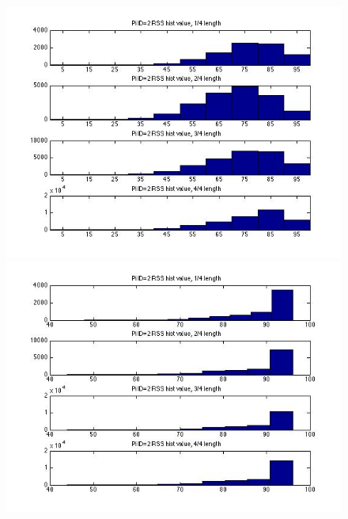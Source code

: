 \documentclass[10pt,conference]{IEEEtran}
\begin{document}
\begin{figure}[htbp]
\centering
\begin{minipage}[t]{0.2\textwidth}
	\centering
	\includegraphics[scale=0.2]{time1-1}
\end{minipage}
\begin{minipage}[t]{0.2\textwidth}
	\centering
	\includegraphics[scale=0.2]{time1-2}
\end{minipage}
\begin{minipage}[t]{0.2\textwidth}
	\centering

\end{minipage}
\end{figure}
\end{document}
